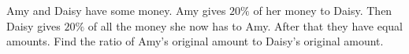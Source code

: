 Amy and Daisy have some money. Amy gives $20\%$ of her money to Daisy. Then Daisy gives $20\%$ of all the money she now has to Amy. After that they have equal amounts. Find the ratio of Amy's original amount to Daisy's original amount.
